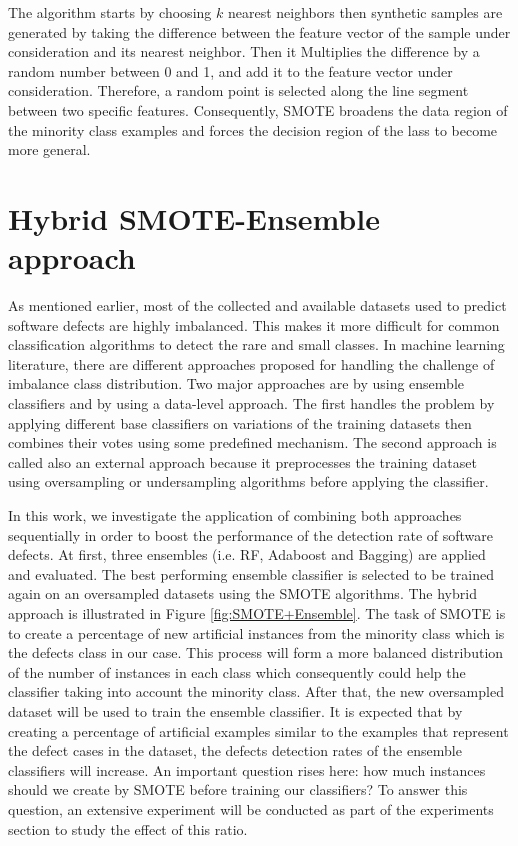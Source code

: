 \documentclass[runningheads,a4paper]{llncs}
\begin{document}
The algorithm starts by choosing $k$ nearest neighbors then synthetic samples
are generated by taking the difference between the feature vector of the sample
under consideration and its nearest neighbor. Then it Multiplies the difference by a random number between 0 and 1, and add it to the feature vector under consideration. Therefore, a random point is selected along the line segment between two specific features. Consequently, SMOTE broadens the data region of the minority class examples and forces the decision region of the lass to become more general.

\section{Hybrid SMOTE-Ensemble approach}

As mentioned earlier, most of the collected and available datasets used to predict software defects are highly imbalanced. This makes it more difficult for common classification algorithms to detect the rare and small classes. In machine learning literature, there are different approaches proposed for handling the challenge of imbalance class distribution. Two major approaches are by using ensemble classifiers and by using a data-level approach. The first handles the problem by applying different base classifiers on variations of the training datasets then combines their votes using some predefined mechanism. The second approach is called also an external approach because it preprocesses the training dataset using oversampling or undersampling algorithms before applying the classifier. 

In this work, we investigate the application of combining both approaches sequentially in order to boost the performance of the detection rate of software defects. At first, three ensembles (i.e. RF, Adaboost and Bagging) are applied and evaluated. The best performing ensemble classifier is selected to be trained again on an oversampled datasets using the SMOTE algorithms. The hybrid approach is illustrated in Figure \ref{fig:SMOTE+Ensemble}. The task of SMOTE is to create a percentage of new artificial instances from the minority class which is the defects class in our case. This process will form a more balanced distribution of the number of instances in each class which consequently could help the classifier taking into account the minority class. After that, the new oversampled dataset will be used to train the ensemble classifier. It is expected that by creating a percentage of artificial examples similar to the examples that represent the defect cases in the dataset, the defects detection rates of the ensemble classifiers will increase. An important question rises here: how much instances should we create by SMOTE before training our classifiers? To answer this question, an extensive experiment will be conducted as part of the experiments section to study the effect of this ratio.
 
\end{document}
